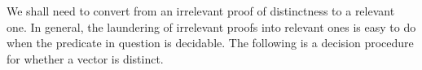\begin{fence}
\begin{code}
\AgdaSpace{}%
\AgdaSymbol{=}\<%
\\
\>[0][@{}l@{\AgdaIndent{0}}]%
\>[4]\AgdaSpace{}%
\AgdaSymbol{(}\AgdaSpace{}%
\AgdaSymbol{(}\AgdaSpace{}%
\AgdaSpace{}%
\AgdaSymbol{))}\<%
\\
\>[0]\AgdaSpace{}%
\AgdaSymbol{\{}\AgdaSpace{}%
\AgdaSymbol{=}\AgdaSpace{}%
\AgdaSpace{}%
\AgdaSpace{}%
\AgdaSymbol{\}}\AgdaSpace{}%
\AgdaSymbol{\{}\AgdaSpace{}%
\AgdaSymbol{\}}\AgdaSpace{}%
\AgdaSymbol{\{}\AgdaSymbol{\}}\AgdaSpace{}%
\AgdaSpace{}%
\AgdaSpace{}%
\AgdaOperator{\AgdaInductiveConstructor{,}}\AgdaSpace{}%
\AgdaSpace{}%
\AgdaSpace{}%
\AgdaSpace{}%
\AgdaSymbol{=}\<%
\\
\>[0][@{}l@{\AgdaIndent{0}}]%
\>[4]\AgdaSpace{}%
\AgdaSymbol{(}\AgdaSpace{}%
\AgdaSymbol{(}\AgdaSpace{}%
\AgdaSpace{}%
\AgdaSymbol{))}\<%
\\
\>[0]\AgdaSpace{}%
\AgdaSymbol{\{}\AgdaSpace{}%
\AgdaSymbol{=}\AgdaSpace{}%
\AgdaSpace{}%
\AgdaSpace{}%
\AgdaSymbol{\}}\AgdaSpace{}%
\AgdaSymbol{\{}\AgdaSpace{}%
\AgdaSymbol{\}}\AgdaSpace{}%
\AgdaSymbol{\{}\AgdaSpace{}%
\AgdaSymbol{\}}\AgdaSpace{}%
\AgdaSpace{}%
\AgdaSpace{}%
\AgdaOperator{\AgdaInductiveConstructor{,}}\AgdaSpace{}%
\AgdaSpace{}%
\AgdaSpace{}%
\AgdaSpace{}%
\AgdaSymbol{=}\<%
\\
\>[0][@{}l@{\AgdaIndent{0}}]%
\>[4]\AgdaSpace{}%
\AgdaSpace{}%
\AgdaSymbol{(}\AgdaSpace{}%
\AgdaSpace{}%
\AgdaSymbol{)}\<%
\end{code}
\end{fence}

We shall need to convert from an irrelevant proof of distinctness to a
relevant one. In general, the laundering of irrelevant proofs into
relevant ones is easy to do when the predicate in question is decidable.
The following is a decision procedure for whether a vector is distinct.

